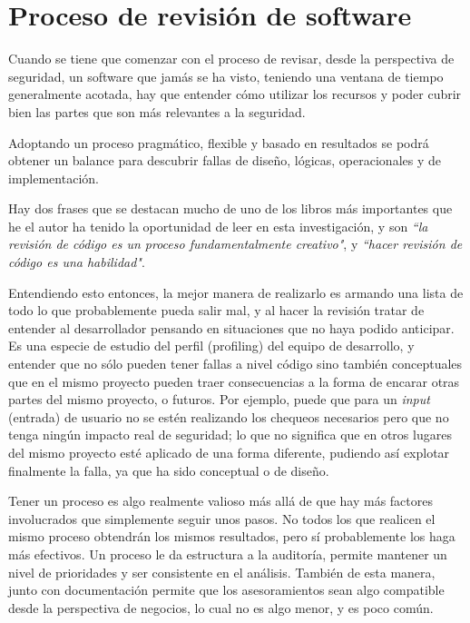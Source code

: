 \section{Proceso de revisión de software}
Cuando se tiene que comenzar con el proceso de revisar, desde la perspectiva de seguridad, un software que jamás se ha visto, teniendo una ventana de tiempo generalmente acotada, hay que entender cómo utilizar los recursos y poder cubrir bien las partes que son más relevantes a la seguridad.

Adoptando un proceso pragmático, flexible y basado en resultados se podrá obtener un balance para descubrir fallas de diseño, lógicas, operacionales y de implementación.

Hay dos frases que se destacan mucho de uno de los libros más importantes que he el autor ha tenido la oportunidad de leer en esta investigación, y son \textit{``la revisión de código es un proceso fundamentalmente creativo"}, y \textit{``hacer revisión de código es una habilidad"}. 

Entendiendo esto entonces, la mejor manera de realizarlo es armando una lista de todo lo que probablemente pueda salir mal, y al hacer la revisión tratar de entender al desarrollador pensando en situaciones que no haya podido anticipar. Es una especie de estudio del perfil (profiling) del equipo de desarrollo, y entender que no sólo pueden tener fallas a nivel código sino también conceptuales que en el mismo proyecto pueden traer consecuencias a la forma de encarar otras partes del mismo proyecto, o futuros. Por ejemplo, puede que para un \textit{input} (entrada) de usuario no se estén realizando los chequeos necesarios pero que no tenga ningún impacto real de seguridad; lo que no significa que en otros lugares del mismo proyecto esté aplicado de una forma diferente, pudiendo así explotar finalmente la falla, ya que ha sido conceptual o de diseño.

Tener un proceso es algo realmente valioso más allá de que hay más factores involucrados que simplemente seguir unos pasos. No todos los que realicen el mismo proceso obtendrán los mismos resultados, pero sí probablemente los haga más efectivos. Un proceso le da estructura a la auditoría, permite mantener un nivel de prioridades y ser consistente en el análisis. También de esta manera, junto con documentación permite que los asesoramientos sean algo compatible desde la perspectiva de negocios, lo cual no es algo menor, y es poco común.

